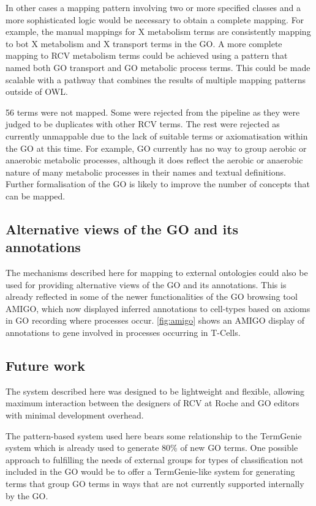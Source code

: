 \documentclass[runningheads,a4paper]{llncs}
\begin{document}
{{In other cases a mapping pattern involving two or more specified classes and a more sophisticated logic would be necessary to obtain a complete mapping.  For example, the manual mappings for X metabolism terms are consistently mapping to bot X metabolism and X transport terms in the \ac{GO}. A more complete mapping to RCV metabolism terms could be achieved using a pattern that named both \ac{GO} transport and \ac{GO} metabolic process terms.  This could be made scalable with a pathway that combines the results of multiple mapping patterns outside of OWL.

56 terms were not mapped.  Some were rejected from the pipeline as they were judged to be duplicates with other RCV terms.  The rest were rejected as currently unmappable due to the lack of suitable terms or axiomatisation within the \ac{GO} at this time.  For example, \ac{GO} currently has no way to group aerobic or anaerobic metabolic processes, although it does reflect the aerobic or anaerobic nature of many metabolic processes in their names and textual definitions. Further formalisation of the \ac{GO} is likely to improve the number of concepts that can be mapped.

\subsection{Alternative views of the \ac{GO} and its annotations}

The mechanisms described here for mapping to external ontologies could also be used for providing alternative views of the \ac{GO} and its annotations.  This is already reflected in some of the newer functionalities of the \ac{GO} browsing tool AMIGO, which now displayed inferred annotations to cell-types based on axioms in \ac{GO} recording where processes occur.  \ref{fig:amigo} shows an AMIGO display of annotations to gene involved in processes occurring in T-Cells.

\subsection{Future work}

The system described here was designed to be lightweight and flexible, allowing maximum interaction between the designers of RCV at Roche and \ac{GO} editors with minimal development overhead.

The pattern-based system used here bears some relationship to the TermGenie system \cite{Dietze2014} which is already used to generate 80\% of new \ac{GO} terms.  One possible approach to fulfilling the needs of external groups for types of classification not included in the \ac{GO} would be to offer a TermGenie-like system for generating terms that group \ac{GO} terms in ways that are not currently supported internally by the \ac{GO}.




}}
\end{document}
